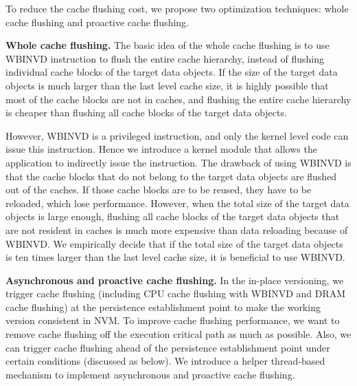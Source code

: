 To reduce the cache flushing cost, we propose two optimization techniques: whole cache flushing and proactive cache flushing.

\textbf{Whole cache flushing.}
The basic idea of the whole cache flushing is to use {\selectfont WBINVD} instruction to flush the entire cache hierarchy, instead of flushing individual cache blocks of the target data objects. If the size of the target data objects is much larger than the last level cache size, %
it is highly possible that most of the cache blocks are not in caches, and flushing the entire cache hierarchy is cheaper than flushing all cache blocks of the target data objects. 

However, {\selectfont WBINVD} is a privileged instruction, and only the kernel level code can issue this instruction. Hence we introduce a kernel module %
that allows the application to indirectly issue the instruction. The drawback of using {\selectfont WBINVD} is that the cache blocks that do not belong to the target data objects
are flushed out of the caches. If those cache blocks are to be reused, they have to be
reloaded, which lose performance. However, when the total size of the target data objects is large enough,
flushing all cache blocks of the target data objects that are not resident in caches is much more expensive than data reloading because of {\selectfont WBINVD}. We empirically decide that
if the total size of the target data objects is ten times larger than the last level cache size, it is beneficial to use {\selectfont WBINVD}.

\textbf{Asynchronous and proactive cache flushing.}
In the in-place versioning, we trigger cache flushing (including CPU cache flushing with {\selectfont WBINVD} and DRAM cache flushing)
at the persistence establishment point to make the working version consistent in NVM.
To improve cache flushing performance, we want to remove cache flushing off the execution critical path as much as possible. 
Also, we can trigger cache flushing ahead of the persistence establishment point
under certain conditions (discussed as below). 
We introduce a helper thread-based mechanism to implement asynchronous
and proactive cache flushing. 

